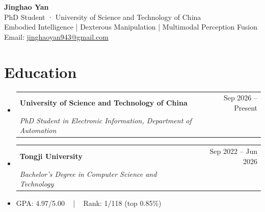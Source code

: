 \documentclass[a4paper,11pt]{article}
\makeatletter
\newcommand{\resumeSubheading}[4]{
  \vspace{-2pt}\item
    \begin{tabular*}{0.97\textwidth}[t]{l@{\extracolsep{\fill}}r}
      \textbf{#1} & #2 \\
      \textit{\small#3} & \textit{\small #4} \\
    \end{tabular*}\vspace{-1pt}
}
\newcommand{\resumeSubHeadingListStart}{\begin{itemize}[leftmargin=0.15in,label={},topsep=2pt,itemsep=2pt,parsep=0pt]}
\newcommand{\resumeSubHeadingListEnd}{\end{itemize}}
\makeatother
\begin{document}
\begin{center}
\textbf{\Huge Jinghao Yan} \\[3pt]
\small PhD Student · University of Science and Technology of China \\[2pt]
\small Embodied Intelligence | Dexterous Manipulation | Multimodal Perception Fusion \\[2pt]
\small Email: \href{mailto:jinghaoyan943@gmail.com}{jinghaoyan943@gmail.com} \\[2pt]
\end{center}

\section{Education}
\resumeSubHeadingListStart
\resumeSubheading{University of Science and Technology of China}{Sep 2026 -- Present}{PhD Student in Electronic Information, Department of Automation}{}
\resumeSubHeadingListEnd
\resumeSubHeadingListStart
\resumeSubheading{Tongji University}{Sep 2022 -- Jun 2026}{Bachelor’s Degree in Computer Science and Technology}{}
\item\small GPA: 4.97/5.00   |   Rank: 1/118 (top 0.85\%)
\resumeSubHeadingListEnd
\end{document}
